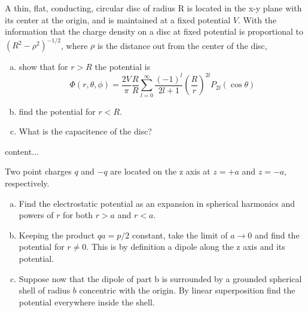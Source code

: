 \documentclass{article}
\begin{document}
\setcounter{problem}{2}
\begin{problem}\label{problem3.3}
A thin, flat, conducting, circular disc of radius R is located in the x-y plane with its center at the origin, and is maintained at a fixed potential $V$. With the information that the charge density on a disc at fixed potential is proportional to $\left( R^{2} - \rho^{2} \right)^{-1/2} $, where $\rho$ is the distance out from the center of the disc,
\begin{enumerate}[(a)]
\item show that for $r > R$ the potential is
\[ \Phi(r,\theta,\phi) = \frac{2V}{\pi} \frac{R}{R} \sum_{l=0}^{\infty} \frac{(-1)^{l}}{2l + 1} \left( \frac{R}{r} \right)^{2l} P_{2l}(\cos \theta) \]
\item find the potential for $r < R$.
\item What is the capacitence of the disc?
\end{enumerate}
\end{problem}

\setcounter{solution}{2}
\begin{solution}
content...
\end{solution}

\setcounter{problem}{5}
\begin{problem}\label{problem3.6}
Two point charges $q$ and $-q$ are located on the z axis at $z = +a$ and $z = -a$, respectively.
\begin{enumerate}[(a)]
\item Find the electrostatic potential as an expansion in spherical harmonics and powers of $r$ for both $r > a$ and $r < a$.
\item Keeping the product $qa = p/2$ constant, take the limit of $a \to 0$ and find the potential for $r \ne 0$. This is by definition a dipole along the z axis and its potential.
\item Suppose now that the dipole of part b is surrounded by a grounded spherical shell of radius $b$ concentric with the origin. By linear superposition find the potential everywhere inside the shell.
\end{enumerate}
\end{problem}
\end{document}
